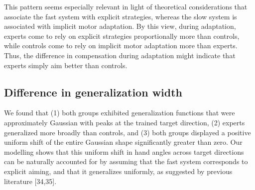 \documentclass[jou, 11pt, longtable, floatsintext, notab]{apa6}
\begin{document}
This pattern seems especially relevant in light of
theoretical considerations that associate the fast system
with explicit strategies, whereas the slow system is
associated with implicit motor adaptation. By this view,
during adaptation, experts come to rely on explicit
strategies proportionally more than controls, while controls
come to rely on implicit motor adaptation more than experts.
Thus, the difference in compensation during adaptation might
indicate that experts simply aim better than controls.





\subsection{Difference in generalization width}
We found that (1) both groups exhibited generalization
functions that were approximately Gaussian with peaks at the
trained target direction, (2) experts generalized more
broadly than controls, and (3) both groups displayed a
positive uniform shift of the entire Gaussian shape
significantly greater than zero. Our modelling shows that
this uniform shift in hand angles across target directions
can be naturally accounted for by assuming that the fast
system corresponds to explicit aiming, and that it
generalizes uniformly, as suggested by previous literature
[34,35].
\end{document}
